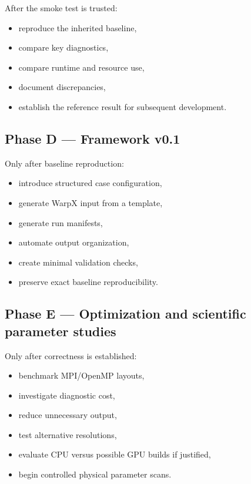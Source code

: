 \documentclass[11pt,a4paper]{article}
\begin{document}
After the smoke test is trusted:

\begin{itemize}
    \item reproduce the inherited baseline,
    \item compare key diagnostics,
    \item compare runtime and resource use,
    \item document discrepancies,
    \item establish the reference result for subsequent development.
\end{itemize}

\subsection{Phase D --- Framework v0.1}

Only after baseline reproduction:

\begin{itemize}
    \item introduce structured case configuration,
    \item generate WarpX input from a template,
    \item generate run manifests,
    \item automate output organization,
    \item create minimal validation checks,
    \item preserve exact baseline reproducibility.
\end{itemize}

\subsection{Phase E --- Optimization and scientific parameter studies}

Only after correctness is established:

\begin{itemize}
    \item benchmark MPI/OpenMP layouts,
    \item investigate diagnostic cost,
    \item reduce unnecessary output,
    \item test alternative resolutions,
    \item evaluate CPU versus possible GPU builds if justified,
    \item begin controlled physical parameter scans.
\end{itemize}
\end{document}
